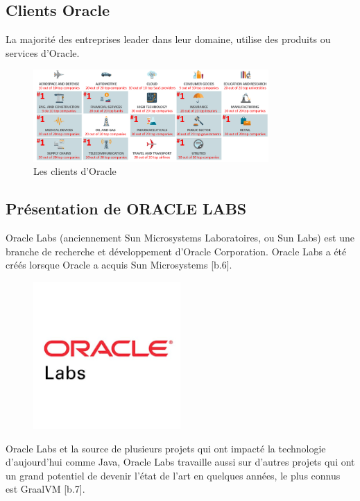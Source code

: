 \subsection{Clients Oracle}
La majorité des entreprises leader dans leur domaine, utilise des produits ou services d’Oracle.
\begin{figure}[h!]  
  \centering
    \includegraphics[width=0.8\textwidth]{chapitre1/Figures/OracleCustumers.PNG}
  \caption{Les clients d'Oracle}
\end{figure}

\subsection{Présentation de ORACLE LABS}
Oracle Labs (anciennement Sun Microsystems Laboratoires, ou Sun Labs) est une branche de recherche et développement d'Oracle Corporation. Oracle Labs a été créés lorsque Oracle a acquis Sun Microsystems [b.6].\\
\begin{figure}[H]  
  \centering
    \includegraphics[width=0.5\textwidth]{chapitre1/Figures/OracleLabs.png}
\end{figure}
Oracle Labs et la source de plusieurs projets qui ont impacté la technologie d’aujourd’hui comme Java, Oracle Labs travaille aussi sur d’autres projets qui ont un grand potentiel de devenir l'état de l'art en quelques années, le plus connus est GraalVM [b.7].\\

